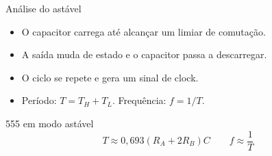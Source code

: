\begin{frame}{Análise do astável}
\begin{itemize}
\item O capacitor carrega até alcançar um limiar de comutação.
\item A saída muda de estado e o capacitor passa a descarregar.
\item O ciclo se repete e gera um sinal de clock.
\item Período: \(T=T_H+T_L\). Frequência: \(f=1/T\).
\end{itemize}
\begin{block}{555 em modo astável}
\[T\approx0{,}693(R_A+2R_B)C\qquad f\approx\frac{1}{T}\]
\end{block}
\end{frame}